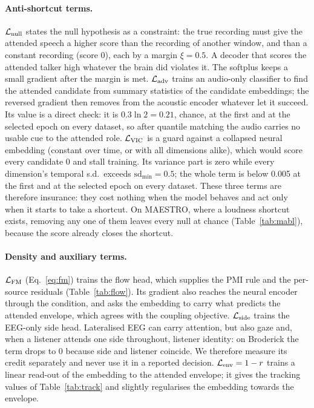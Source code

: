 \documentclass[10pt,twocolumn,letterpaper]{article}
\begin{document}
\paragraph{Anti-shortcut terms.} $\mathcal L_{\rm null}$ states the null hypothesis as a
constraint: the true recording must give the attended speech a higher score than the
recording of another window, and than a constant recording (score 0), each by a margin
$\xi=0.5$. A decoder that scores the attended talker high whatever the brain did violates
it. The softplus keeps a small gradient after the margin is met. $\mathcal L_{\rm adv}$
trains an audio-only classifier to find the attended candidate from summary statistics of
the candidate embeddings; the reversed gradient \citep{ganin2016domain} then removes from
the acoustic encoder whatever let it succeed. Its value is a direct check: it is
$0.3\ln 2=0.21$, chance, at the first and at the selected epoch on every dataset, so after
quantile matching the audio carries no usable cue to the attended role. $\mathcal L_{\rm VIC}$ is a
guard against a collapsed neural embedding (constant over time, or with all dimensions
alike), which would score every candidate 0 and stall training. Its variance part is zero while every
dimension's temporal s.d.\ exceeds $\mathrm{sd}_{\min}=0.5$; the whole term is below 0.005 at the first
and at the selected epoch on every dataset. These
three terms are therefore insurance: they cost nothing when the model behaves and act only
when it starts to take a shortcut. On MAESTRO, where a loudness shortcut exists, removing
any one of them leaves every null at chance (Table~\ref{tab:mabl}), because the score already closes
the shortcut.

\paragraph{Density and auxiliary terms.} $\mathcal L_{\rm FM}$ (Eq.~\ref{eq:fm}) trains the
flow head, which supplies the PMI rule and the per-source residuals (Table~\ref{tab:flow}).
Its gradient also reaches the neural encoder through the condition, and asks the embedding to
carry what predicts the attended envelope, which agrees with the coupling objective.
$\mathcal L_{\rm side}$ trains the EEG-only side head. Lateralised EEG can carry attention,
but also gaze and, when a listener attends one side throughout, listener identity: on
Broderick the term drops to 0 because side and listener coincide. We therefore measure its
credit separately and never use it in a reported decision. $\mathcal L_{\rm env}=1-r$
trains a linear read-out of the embedding to the attended envelope; it gives the tracking
values of Table~\ref{tab:track} and slightly regularises the embedding towards the envelope.
\end{document}
